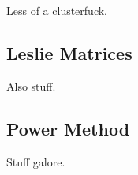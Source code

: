 
Less of a clusterfuck.

\subsection{Leslie Matrices}

Also stuff.

\subsection{Power Method}

Stuff galore.

